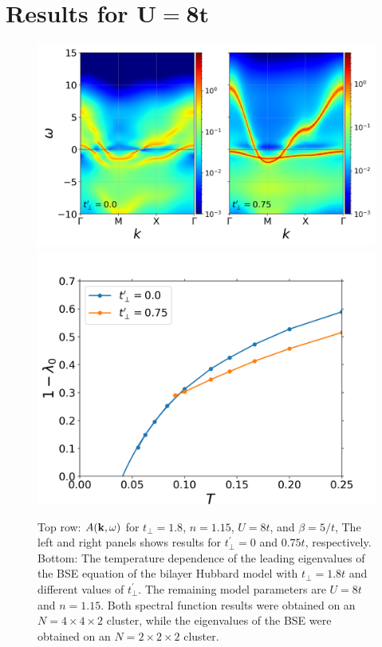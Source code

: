 \documentclass[prb,twocolumn,amsmath,amssymb,superscriptaddress,floatfix,nofootinbib]{revtex4-2}
\begin{document}
\appendix
\section{Results for $\mathbf{U = 8t}$}\label{sec:appendixU8}
\begin{figure}
\centering
\includegraphics[scale=0.34]{Akw_tp1pt8_tpp0pt0_0pt75_U8.png}
\includegraphics[scale=0.4]{2x2_n0.85_tperp1.8_varyT.png}
\caption{Top row: $A({\bf k},\omega)$ for $t_{\perp}= 1.8$, $n = 1.15$, $U = 8t$, and $\beta = 5/t$, 
The left and right panels shows results for $t^\prime_\perp = 0$ and $0.75t$, respectively. 
Bottom: The temperature dependence of the leading eigenvalues of the BSE equation of the bilayer Hubbard model with $t_{\perp}=1.8t$ and different values of $t_{\perp}^{\prime}$. The remaining model parameters are $U=8t$ and $n=1.15$. 
Both spectral function results were obtained on an $N = 4\times 4\times 2$ cluster, while the eigenvalues of the 
BSE were obtained on an $N = 2\times 2\times 2$ cluster. 
 }
\label{fig:U8}
\end{figure}
\end{document}
